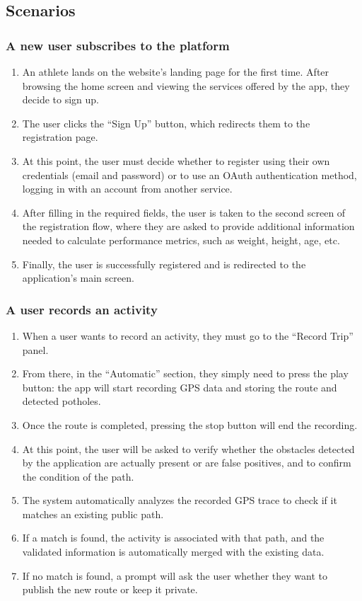 \subsection{Scenarios}
\subsubsection*{A new user subscribes to the platform}
\begin{enumerate}
    \item An athlete lands on the website's landing page for the first time. After browsing the home screen and viewing the services offered by the app, they decide to sign up.
    \item The user clicks the “Sign Up” button, which redirects them to the registration page.
    \item At this point, the user must decide whether to register using their own credentials (email and password) or to use an OAuth authentication method, logging in with an account from another service.
    \item After filling in the required fields, the user is taken to the second screen of the registration flow, where they are asked to provide additional information needed to calculate performance metrics, such as weight, height, age, etc.
    \item Finally, the user is successfully registered and is redirected to the application's main screen.
\end{enumerate}
\subsubsection*{A user records an activity}

\begin{enumerate}
    \item When a user wants to record an activity, they must go to the “Record Trip” panel.
    \item From there, in the “Automatic” section, they simply need to press the play button: the app will start recording GPS data and storing the route and detected potholes.
    \item Once the route is completed, pressing the stop button will end the recording.
    \item At this point, the user will be asked to verify whether the obstacles detected by the application are actually present or are false positives, and to confirm the condition of the path.
    \item The system automatically analyzes the recorded GPS trace to check if it matches an existing public path.
    \item If a match is found, the activity is associated with that path, and the validated information is automatically merged with the existing data.
    \item If no match is found, a prompt will ask the user whether they want to publish the new route or keep it private.
\end{enumerate}

